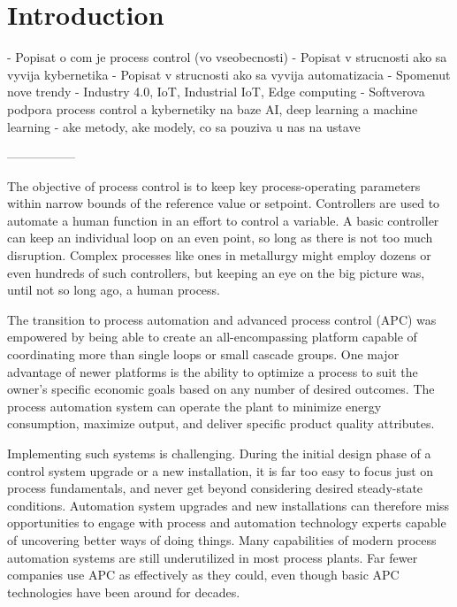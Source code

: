 \setcounter{page}{1}
\setcounter{equation}{0}
\setcounter{figure}{0}
\setcounter{table}{0}

\section{Introduction}

- Popisat o com je process control (vo vseobecnosti)
- Popisat v strucnosti ako sa vyvija kybernetika
- Popisat v strucnosti ako sa vyvija automatizacia
- Spomenut nove trendy - Industry 4.0, IoT, Industrial IoT, Edge computing
- Softverova podpora process control a kybernetiky na baze AI, deep learning a machine learning - ake metody, ake modely, co sa pouziva u nas na ustave

-----------------

The objective of process control is to keep key process-operating parameters within narrow bounds of the reference value or setpoint. Controllers are used to automate a human function in an effort to control a variable. A basic controller can keep an individual loop on an even point, so long as there is not too much disruption. Complex processes like ones in metallurgy might employ dozens or even hundreds of such controllers, but keeping an eye on the big picture was, until not so long ago, a human process.

The transition to process automation and advanced process control (APC) was empowered by being able to create an all-encompassing platform capable of coordinating more than single loops or small cascade groups. One major advantage of newer platforms is the ability to optimize a process to suit the owner’s specific economic goals based on any number of desired outcomes. The process automation system can operate the plant to minimize energy consumption, maximize output, and deliver specific product quality attributes.

Implementing such systems is challenging. During the initial design phase of a control system upgrade or a new installation, it is far too easy to focus just on process fundamentals, and never get beyond considering desired steady-state conditions. Automation system upgrades and new installations can therefore miss opportunities to engage with process and automation technology experts capable of uncovering better ways of doing things. Many capabilities of modern process automation systems are still underutilized in most process plants. Far fewer companies use APC as effectively as they could, even though basic APC technologies have been around for decades.


